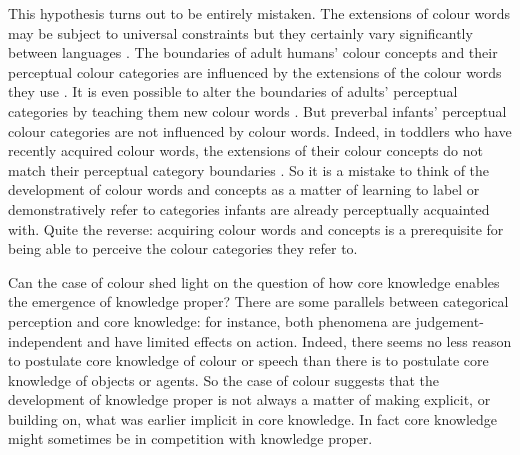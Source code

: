 \documentclass[12pt,\papersize]{extarticle}
\begin{document}
This hypothesis turns out to be entirely mistaken. 
The extensions of colour words may be subject to universal constraints but they certainly vary significantly between languages  \citep{kay:2003_resolving}.
The boundaries of adult humans' colour concepts and their perceptual colour categories  are influenced by the extensions of the colour words they use \citep{Kay:2006ly,Roberson:2007wg,Winawer:2007im}. 
It is even possible to alter the boundaries of adults' perceptual categories by teaching them new colour words
\citep{Ozgen:2002yk}. 
But preverbal infants' perceptual colour categories are not influenced by colour words. 
Indeed, in toddlers who have recently acquired colour words, the extensions of their colour concepts do not match their perceptual category boundaries \citep{Franklin:2005hp}. 
So it is a mistake to think of the development of colour words and concepts as a matter of learning to label or demonstratively refer to categories infants are already perceptually acquainted with. 
Quite the reverse: acquiring colour words and concepts is a prerequisite for being able to perceive the colour categories they refer to.


Can the case of colour shed light on the question of how core knowledge enables the emergence of knowledge proper?
There are some parallels between categorical perception and core knowledge: for instance, both phenomena are judgement-independent and have limited effects on action. 
Indeed, there seems no less reason to postulate core knowledge of colour or speech than there is to postulate core knowledge of objects or agents. 
So the case of colour suggests that the development of knowledge proper is not always a matter of making explicit, or building on, what was earlier implicit in core knowledge. 
In fact core knowledge might sometimes be in competition with knowledge proper. 
\end{document}
